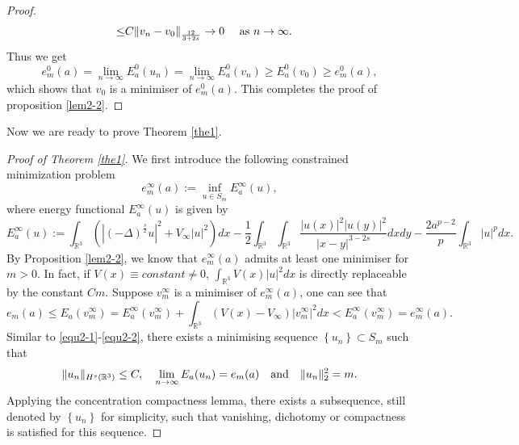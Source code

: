 \documentclass[reqno, 11pt]{amsart} %
\numberwithin{equation}{section}
\begin{document}
\begin{proof}
\begin{equation*}
\begin{split}
				\leq& C\| v_{n}-v_{0}\|_{\frac{12}{3+2s}}\rightarrow0\quad  \hbox{ as $n\rightarrow\infty$}.
			\end{split}
		\end{equation*}
		Thus we get 
		\begin{equation*}
			e^{0}_{m}(a)=\lim _{n\rightarrow\infty}E^{0}_{a}(u_{n})=\lim _{n\rightarrow\infty}E^{0}_{a}(v_{n})\geq E^{0}_{a}(v_{0})\geq e^{0}_{m}(a),
		\end{equation*}
		which shows that $v_{0}$ is a minimiser of $e^{0}_{m}(a)$. This completes the proof of proposition \ref{lem2-2}.
	\end{proof}
	
	
	Now we are ready to prove Theorem \ref{the1}.
	
	\begin{proof}[Proof of Theorem \ref{the1}] We first introduce the following constrained minimization problem
		\begin{equation*}
			e^{\infty}_{m}(a):=\inf_{u\in S_{m}}E^{\infty}_{a}(u),
		\end{equation*}
		where energy functional $E^{\infty}_{a}(u)$ is given by
		\begin{equation*}
			E^{\infty}_{a}(u):=\int_{\mathbb{R}^{3}}\left( |(-\Delta)^{\frac{s}{2}} u|^{2}+V_{\infty}\left| u\right| ^{2}\right) dx-\frac{1}{2}\int_{\mathbb{R}^{3}}\int_{\mathbb{R}^{3}}\frac{|u(x)|^{2}|u(y)|^{2}}{|x-y|^{3-2s}}dxdy-\frac{2a^{p-2}}{p}\int_{\mathbb{R}^{3}}|u|^{p}dx.
		\end{equation*}	
		By Proposition \ref{lem2-2}, we know that $e^{\infty}_{m}(a)$ admits at least one minimiser for $m>0$. In fact, if $V(x)\equiv constant\neq0$, $\int_{\mathbb{R}^{3}}V(x)\left| u\right| ^{2}dx$ is directly replaceable by the constant $Cm$. Suppose $v_{m}^{\infty}$ is a minimiser of $e^{\infty}_{m}(a)$, one can see that
		\begin{equation}\label{equ2-13}
			e_{m}(a)\leq E_{a}(v_{m}^{\infty})=E^{\infty}_{a}(v_{m}^{\infty})+\int_{\mathbb{R}^{3}}\left( V(x)-V_{\infty}\right) \left| v_{m}^{\infty}\right| ^{2}dx<E^{\infty}_{a}(v_{m}^{\infty})=e^{\infty}_{m}(a).
		\end{equation}
		Similar to \eqref{equ2-1}-\eqref{equ2-2},  there exists a minimising sequence $\left\lbrace u_{n}\right\rbrace \subset S_{m}$ such that
		\begin{equation*}
			\| u_{n}\|_{H^{s}(\mathbb{R}^{3})}\leq C,	\quad  \lim _{n\rightarrow\infty}E_{a}(u_{n})=e_{m}(a)\quad \hbox{and}\quad \|u_{n}\|_{2}^{2}=m.
		\end{equation*}
		Applying the concentration compactness lemma, there exists a subsequence, still denoted by $\left\lbrace u_{n}\right\rbrace $ for simplicity, such that vanishing, dichotomy or compactness is satisfied for this sequence.
		

\end{proof}
\end{document}
